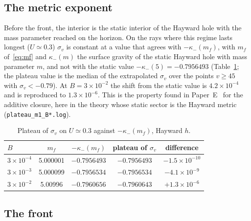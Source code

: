 \documentclass[11pt]{article}
\begin{document}
\subsection{The metric exponent}

Before the front, the interior is the static interior of the Hayward hole with the mass parameter reached on the horizon. On the rays where this regime lasts longest ($U\simeq0.3$) $\sigma_v$ is constant at a value that agrees with $-\kappa_-(m_f)$, with $m_f$ of~\eqref{eq:mf} and $\kappa_-(m)$ the surface gravity of the static Hayward hole with mass parameter $m$, and not with the static value $-\kappa_-(5)=-0.7956493$ (Table~\ref{tab:exp}; the plateau value is the median of the extrapolated $\sigma_v$ over the points $v\ge45$ with $\sigma_v<-0.79$). At $B=3\times10^{-2}$ the shift from the static value is $4.2\times10^{-4}$ and is reproduced to $1.3\times10^{-6}$. This is the property found in Paper~E~\citep{PaperE} for the additive closure, here in the theory whose static sector is the Hayward metric (\texttt{plateau\_m1\_B*.log}).

\begin{table}[ht]\centering\small
\caption{Plateau of $\sigma_v$ on $U\simeq0.3$ against $-\kappa_-(m_f)$, Hayward $h$.}\label{tab:exp}
\begin{tabular}{lcccc}
\toprule
$B$ & $m_f$ & $-\kappa_-(m_f)$ & plateau of $\sigma_v$ & difference\\\midrule
$3\times10^{-4}$ & 5.000001 & $-0.7956493$ & $-0.7956493$ & $-1.5\times10^{-10}$\\
$3\times10^{-3}$ & 5.000099 & $-0.7956534$ & $-0.7956534$ & $-4.1\times10^{-9}$\\
$3\times10^{-2}$ & 5.00996 & $-0.7960656$ & $-0.7960643$ & $+1.3\times10^{-6}$\\\bottomrule
\end{tabular}
\end{table}

\subsection{The front}
\label{sec:front}
\end{document}
